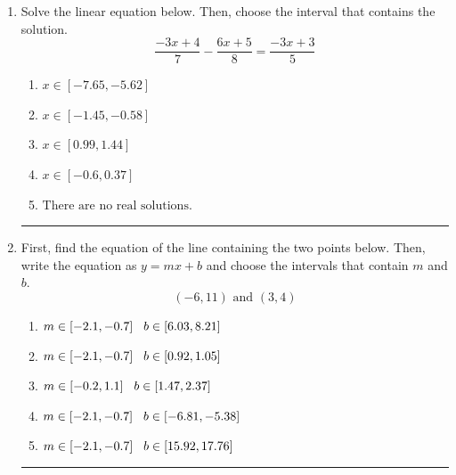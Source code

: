 \documentclass[14pt]{extbook}
\newcommand{\litem}[1]{\item#1\hspace*{-1cm}\rule{\textwidth}{0.4pt}}
\begin{document}
\begin{enumerate}
\litem{
Solve the linear equation below. Then, choose the interval that contains the solution.\[ \frac{-3x + 4}{7} - \frac{6x + 5}{8} = \frac{-3x + 3}{5} \]\begin{enumerate}[label=\Alph*.]
\item \( x \in [-7.65, -5.62] \)
\item \( x \in [-1.45, -0.58] \)
\item \( x \in [0.99, 1.44] \)
\item \( x \in [-0.6, 0.37] \)
\item \( \text{There are no real solutions.} \)

\end{enumerate} }
\litem{
First, find the equation of the line containing the two points below. Then, write the equation as $ y=mx+b $ and choose the intervals that contain $m$ and $b$.\[ (-6, 11) \text{ and } (3, 4) \]\begin{enumerate}[label=\Alph*.]
\item \( m \in [-2.1, -0.7] \hspace*{3mm} b \in [6.03, 8.21] \)
\item \( m \in [-2.1, -0.7] \hspace*{3mm} b \in [0.92, 1.05] \)
\item \( m \in [-0.2, 1.1] \hspace*{3mm} b \in [1.47, 2.37] \)
\item \( m \in [-2.1, -0.7] \hspace*{3mm} b \in [-6.81, -5.38] \)
\item \( m \in [-2.1, -0.7] \hspace*{3mm} b \in [15.92, 17.76] \)


\end{enumerate}}
\end{enumerate}
\end{document}
